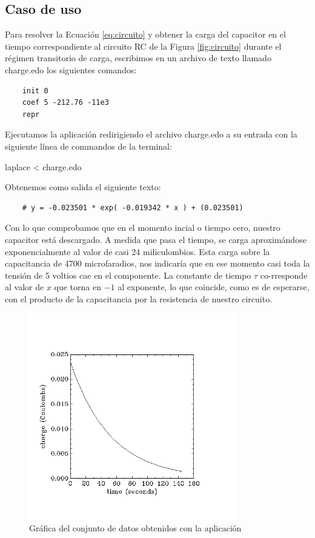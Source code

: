 \documentclass[a4paper]{article}
\begin{document}
\subsection{Caso de uso}

Para resolver la Ecuación \ref{eq:circuito} y obtener la
carga del capacitor en el tiempo correspondiente al 
circuito RC de la Figura \ref{fig:circuito} durante el 
régimen transitorio de carga, escribimos en un archivo 
de texto llamado {\ttfamily charge.edo} los siguientes 
comandos:

\begin{verbatim}
    init 0
    coef 5 -212.76 -11e3
    repr 
\end{verbatim}

Ejecutamos la aplicación redirigiendo el archivo 
{\ttfamily charge.edo} a su entrada con la siguiente
línea de commandos de la terminal:

\begin{center}\ttfamily
    laplace < charge.edo
\end{center}

Obtenemos como salida el siguiente texto:

\begin{verbatim}
    # y = -0.023501 * exp( -0.019342 * x ) + (0.023501)
\end{verbatim}

Con lo que comprobamos que en el momento incial o tiempo
cero, nuestro capacitor está descargado. A medida
que pasa el tiempo, se carga aproximándose exponencialmente
al valor de casi 24 miliculombios. Esta carga sobre la
capacitancia de 4700 microfaradios, nos indicaría que 
en ese momento casi toda la tensión de 5 voltios cae en el
componente. La constante de tiempo $\tau$ co-rresponde
al valor de $x$ que torna en $-1$ al exponente, lo que
coincide, como es de esperarse, con el producto de la
capacitancia por la resistencia de nuestro circuito.

\begin{figure}[htb]\centering
    \includegraphics[height=9cm]{drain.png}
    \caption{Gráfica del conjunto de datos obtenidos con la aplicación}
    \label{fig:graph}
\end{figure}
\end{document}
